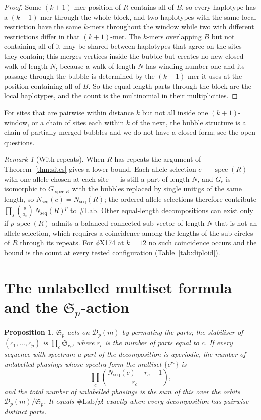 \documentclass[11pt]{article}
\theoremstyle{plain}
\newtheorem{proposition}[theorem]{Proposition}
\theoremstyle{definition}
\theoremstyle{remark}
\newtheorem{remark}[theorem]{Remark}
\newcommand{\spec}{\operatorname{spec}}
\newcommand{\Nseq}{N_{\mathrm{seq}}}
\newcommand{\Lab}{\#\mathrm{Lab}}
\newcommand{\Sym}{\mathfrak{S}}
\begin{document}
\begin{proof}
Some $(k{+}1)$-mer position of $R$ contains all of $B$, so every haplotype has a
$(k{+}1)$-mer through the whole block, and two haplotypes with the same local restriction have
the same $k$-mers throughout the window while two with different restrictions differ in that
$(k{+}1)$-mer. The $k$-mers overlapping $B$ but not containing all of it may be shared between
haplotypes that agree on the sites they contain; this merges vertices inside the bubble but
creates no new closed walk of length $N$, because a walk of length $N$ has winding number one
and its passage through the bubble is determined by the $(k{+}1)$-mer it uses at the position
containing all of $B$. So the equal-length parts through the block are the local haplotypes,
and the count is the multinomial in their multiplicities.
\end{proof}

For sites that are pairwise within distance $k$ but not all inside one $(k{+}1)$-window, or a
chain of sites each within $k$ of the next, the bubble structure is a chain of partially merged
bubbles and we do not have a closed form; see the open questions.

\begin{remark}[With repeats]\label{rem:repeats}
When $R$ has repeats the argument of Theorem~\ref{thm:sites} gives a lower bound. Each allele
selection $c$ --- $\spec(R)$ with one allele chosen at each site --- is still a part of length
$N$, and $G_c$ is isomorphic to $G_{\spec R}$ with the bubbles replaced by single unitigs of
the same length, so $\Nseq(c)=\Nseq(R)$; the ordered allele selections therefore contribute
$\prod_s\binom{p}{a_s}\,\Nseq(R)^p$ to $\Lab$. Other equal-length decompositions can exist only
if $p\,\spec(R)$ admits a balanced connected sub-vector of length $N$ that is not an allele
selection, which requires a coincidence among the lengths of the sub-circles of $R$ through
its repeats. For $\phi$X174 at $k=12$ no such coincidence occurs and the bound is the count at
every tested configuration (Table~\ref{tab:diploid}).
\end{remark}

\section{The unlabelled multiset formula and the
\texorpdfstring{$\Sym_p$}{Sp}-action}\label{sec:unlabelled}

\begin{proposition}\label{prop:multiset}
$\Sym_p$ acts on $\mathcal D_p(m)$ by permuting the parts; the stabiliser of
$(c_1,\dots,c_p)$ is $\prod_c\Sym_{r_c}$, where $r_c$ is the number of parts equal to $c$.
If every sequence with spectrum a part of the decomposition is aperiodic, the number of
unlabelled phasings whose spectra form the multiset $\{c^{r_c}\}$ is
\[
  \prod_{c}\binom{\Nseq(c)+r_c-1}{r_c},
\]
and the total number of unlabelled phasings is the sum of this over the orbits
$\mathcal D_p(m)/\Sym_p$. It equals $\Lab/p!$ exactly when every decomposition has pairwise
distinct parts.
\end{proposition}
\end{document}
